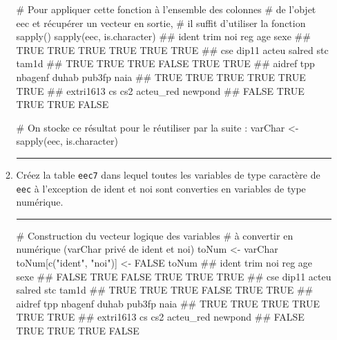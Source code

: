 \documentclass[12pt,twosided, notitlepage]{book}
\newenvironment{Shaded}{}{}
\newcommand{\CommentTok}[1]{\textcolor[rgb]{0.00,0.50,0.00}{#1}}
\newcommand{\KeywordTok}[1]{\textcolor[rgb]{0.00,0.00,1.00}{#1}}
\newcommand{\NormalTok}[1]{#1}
\newcommand{\OtherTok}[1]{\textcolor[rgb]{1.00,0.25,0.00}{#1}}
\newcommand{\StringTok}[1]{\textcolor[rgb]{0.00,0.50,0.50}{#1}}
\newif \ifsol
\renewenvironment{Shaded}{\begin{snugshade}}{\end{snugshade}}
\begin{document}
\begin{enumerate}
\begin{enumerate}
\begin{Shaded}
\begin{Highlighting}[]
\CommentTok{# Pour appliquer cette fonction à l'ensemble des colonnes}
\CommentTok{# de l'objet eec et récupérer un vecteur en sortie, }
\CommentTok{# il suffit d'utiliser la fonction sapply()}
\KeywordTok{sapply}\NormalTok{(eec, is.character)}
\NormalTok{  ##     ident      trim       noi       reg       age      sexe }
\NormalTok{  ##      TRUE      TRUE      TRUE      TRUE      TRUE      TRUE }
\NormalTok{  ##       cse     dip11     acteu    salred       stc     tam1d }
\NormalTok{  ##      TRUE      TRUE      TRUE     FALSE      TRUE      TRUE }
\NormalTok{  ##    aidref       tpp   nbagenf     duhab    pub3fp      naia }
\NormalTok{  ##      TRUE      TRUE      TRUE      TRUE      TRUE      TRUE }
\NormalTok{  ## extri1613        cs       cs2 acteu_red   newpond }
\NormalTok{  ##     FALSE      TRUE      TRUE      TRUE     FALSE}

\CommentTok{# On stocke ce résultat pour le réutiliser par la suite :}
\NormalTok{varChar <-}\StringTok{ }\KeywordTok{sapply}\NormalTok{(eec, is.character)}
\end{Highlighting}
\end{Shaded}

    \begin{center} \rule{0.5\linewidth}{\linethickness}\end{center} 
      \bigskip 
      \fi
  \item
    Créez la table \texttt{eec7} dans lequel toutes les variables de
    type caractère de \texttt{eec} à l'exception de ident et noi sont
    converties en variables de type numérique.

    \ifsol 
     \begin{center} \rule{0.5\linewidth}{\linethickness}\end{center}

\begin{Shaded}
\begin{Highlighting}[]
\CommentTok{# Construction du vecteur logique des variables }
\CommentTok{# à convertir en numérique (varChar privé de ident et noi)}
\NormalTok{toNum <-}\StringTok{ }\NormalTok{varChar}
\NormalTok{toNum[}\KeywordTok{c}\NormalTok{(}\StringTok{"ident"}\NormalTok{, }\StringTok{"noi"}\NormalTok{)] <-}\StringTok{ }\OtherTok{FALSE}
\NormalTok{toNum}
\NormalTok{  ##     ident      trim       noi       reg       age      sexe }
\NormalTok{  ##     FALSE      TRUE     FALSE      TRUE      TRUE      TRUE }
\NormalTok{  ##       cse     dip11     acteu    salred       stc     tam1d }
\NormalTok{  ##      TRUE      TRUE      TRUE     FALSE      TRUE      TRUE }
\NormalTok{  ##    aidref       tpp   nbagenf     duhab    pub3fp      naia }
\NormalTok{  ##      TRUE      TRUE      TRUE      TRUE      TRUE      TRUE }
\NormalTok{  ## extri1613        cs       cs2 acteu_red   newpond }
\NormalTok{  ##     FALSE      TRUE      TRUE      TRUE     FALSE}


\end{Highlighting}
\end{Shaded}
\end{enumerate}
\end{enumerate}
\end{document}

